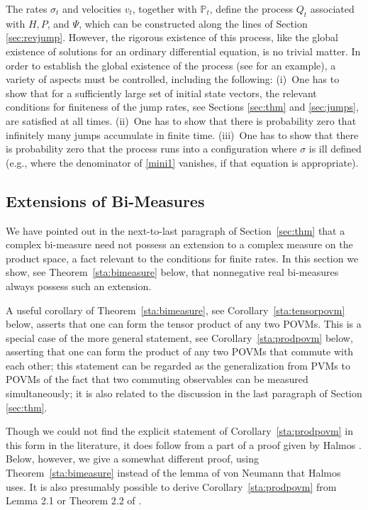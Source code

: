 \documentclass[12pt]{article}
\newcommand{\1}{\mathbf{1}} %
\newcommand{\measure}{\mathbb{P}} %
\newcommand{\pov}{{P}}%
\begin{document}
The rates $\sigma_t$ and velocities $v_t$, together with $\measure_t$,
define the process $Q_t$ associated with $H,\pov$, and $\Psi$, which
can be constructed along the lines of Section
\ref{sec:revjump}. However, the rigorous existence of this process,
like the global existence of solutions for an ordinary differential
equation, is no trivial matter. In order to establish the global
existence of the process (see \cite{crex1} for an example), a variety
of aspects must be controlled, including the following: (i)~One has to
show that for a sufficiently large set of initial state vectors, the
relevant conditions for finiteness of the jump rates, see Sections
\ref{sec:thm} and \ref{sec:jumps}, are satisfied at all
times. (ii)~One has to show that there is probability zero that
infinitely many jumps accumulate in finite time. (iii)~One has to show
that there is probability zero that the process runs into a
configuration where $\sigma$ is ill defined (e.g., where the
denominator of \eqref{mini1} vanishes, if that equation is
appropriate).


\subsection{Extensions of Bi-Measures}\label{sec:tensorpovm}

We have pointed out in the next-to-last paragraph of
Section~\ref{sec:thm} that a complex bi-measure need not possess an
extension to a complex measure on the product space, a fact relevant
to the conditions for finite rates.  In this section we show, see
Theorem~\ref{sta:bimeasure} below, that nonnegative real bi-measures
always possess such an extension.

A useful corollary of Theorem~\ref{sta:bimeasure}, see
Corollary~\ref{sta:tensorpovm} below, asserts that one can form the
tensor product of any two POVMs. This is a special case of the more
general statement, see Corollary~\ref{sta:prodpovm} below, asserting
that one can form the product of any two POVMs that commute with each
other; this statement can be regarded as the generalization from PVMs
to POVMs of the fact that two commuting observables can be measured
simultaneously; it is also related to the discussion in the last
paragraph of Section \ref{sec:thm}.

Though we could not find the explicit statement of
Corollary~\ref{sta:prodpovm} in this form in the literature, it does
follow from a part of a proof given by Halmos \cite[p.~72]{HalHil}.
Below, however, we give a somewhat different proof, using
Theorem~\ref{sta:bimeasure} instead of the lemma of von Neumann
\cite[p.~167]{vonNeumann} that Halmos uses.  It is also presumably
possible to derive Corollary~\ref{sta:prodpovm} from Lemma 2.1 or
Theorem 2.2 of \cite{Davies}.
\end{document}
